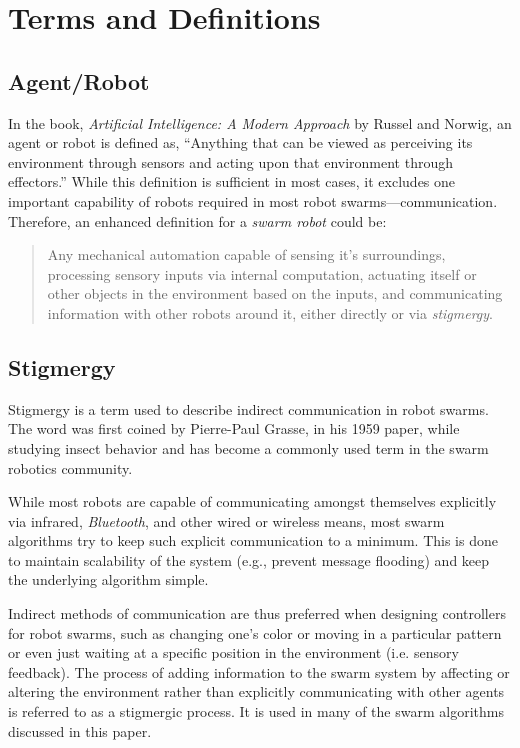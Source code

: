 \documentclass[Main.tex]{subfiles}
\begin{document}
\section{Terms and Definitions}
\subsection{Agent/Robot}
In the book, \emph{Artificial Intelligence: A Modern Approach} by Russel and Norwig\cite{Russel1995}, an agent or robot is defined as, ``Anything that can be viewed as perceiving its environment through sensors and acting upon that environment through effectors.'' While this definition is sufficient in most cases, it excludes one important capability of robots required in most robot swarms---communication. Therefore, an enhanced definition for a \emph{swarm robot} could be: 
\begin{quote}
Any mechanical automation capable of sensing it's surroundings, processing sensory inputs via internal computation, actuating itself or other objects in the environment based on the inputs, and communicating information with other robots around it, either directly or via \emph{stigmergy}.
\end{quote}


\subsection{Stigmergy}
Stigmergy is a term used to describe indirect communication in robot swarms. The word was first coined by Pierre-Paul Grasse, in his 1959 paper\cite{Grasse1959}, while studying insect behavior and has become a commonly used term in the swarm robotics community. 

While most robots are capable of communicating amongst themselves explicitly via infrared, \emph{Bluetooth}\texttrademark, and other wired or wireless means, most swarm algorithms try to keep such explicit communication to a minimum. This is done to maintain scalability of the system (e.g., prevent message flooding) and keep the underlying algorithm simple.

Indirect methods of communication are thus preferred when designing controllers for robot swarms, such as changing one's color or moving in a particular pattern or even just waiting at a specific position in the environment (i.e. sensory feedback). The process of adding information to the swarm system by affecting or altering the environment rather than explicitly communicating with other agents is referred to as a stigmergic process\cite{Balch2005}. It is used in many of the swarm algorithms discussed in this paper.
\end{document}

